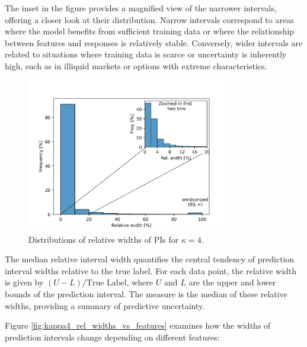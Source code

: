 \documentclass{article}
\theoremstyle{definition}
\begin{document}
The inset in the figure provides a magnified view of the narrower intervals, offering a closer look at their distribution. Narrow intervals correspond to areas where the model benefits from sufficient training data or where the relationship between features and responses is relatively stable. Conversely, wider intervals are related to situations where training data is scarce or uncertainty is inherently high, such as in illiquid markets or options with extreme characteristics.

\begin{figure}[H]
\centering
\includegraphics[width=0.8\textwidth]{reports/figures/simulated_data/sim_kappa4_relative_widths.png}
\caption{Distributions of relative widths of PIs for $\kappa=4$.}
\label{fig:kappa4_rel_widths}
\end{figure}

The median relative interval width quantifies the central tendency of prediction interval widths relative to the true label. For each data point, the relative width is given by $ (U - L) / \text{True Label} $, where $U$ and $L$ are the upper and lower bounds of the prediction interval. The measure is the median of these relative widths, providing a summary of predictive uncertainty.

Figure \ref{fig:kappa4_rel_widths_vs_features} examines how the widths of prediction intervals change depending on different features:
\end{document}
